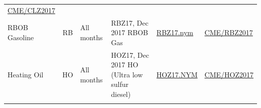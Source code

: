 \documentclass[]{book}
\theoremstyle{definition}
\theoremstyle{definition}
\theoremstyle{remark}
\begin{document}
\begin{longtable}[]{@{}lcllll@{}}
\begin{minipage}[t]{0.13\columnwidth}
\href{https://www.quandl.com/data/CME/CLZ2017-Crude-Oil-Futures-September-2017-CLZ2017}{CME/CLZ2017}\strut
\end{minipage}\tabularnewline
\begin{minipage}[t]{0.07\columnwidth}\raggedright\strut
RBOB Gasoline\strut
\end{minipage} & \begin{minipage}[t]{0.07\columnwidth}\centering\strut
RB\strut
\end{minipage} & \begin{minipage}[t]{0.32\columnwidth}\raggedright\strut
All months\strut
\end{minipage} & \begin{minipage}[t]{0.13\columnwidth}\raggedright\strut
RBZ17, Dec 2017 RBOB Gas\strut
\end{minipage} & \begin{minipage}[t]{0.13\columnwidth}\raggedright\strut
\href{https://finance.yahoo.com/quote/RBZ17.NYM}{RBZ17.nym}\strut
\end{minipage} & \begin{minipage}[t]{0.13\columnwidth}\raggedright\strut
\href{https://www.quandl.com/data/CME/RBZ2017-RBOB-Gasoline-Physical-Futures-December-2017-RBZ2017}{CME/RBZ2017}\strut
\end{minipage}\tabularnewline
\begin{minipage}[t]{0.07\columnwidth}\raggedright\strut
Heating Oil\strut
\end{minipage} & \begin{minipage}[t]{0.07\columnwidth}\centering\strut
HO\strut
\end{minipage} & \begin{minipage}[t]{0.32\columnwidth}\raggedright\strut
All months\strut
\end{minipage} & \begin{minipage}[t]{0.13\columnwidth}\raggedright\strut
HOZ17, Dec 2017 HO (Ultra low sulfur diesel)\strut
\end{minipage} & \begin{minipage}[t]{0.13\columnwidth}\raggedright\strut
\href{https://finance.yahoo.com/quote/HOZ17.NYM/?p=HOZ17.NYM}{HOZ17.NYM}\strut
\end{minipage} & \begin{minipage}[t]{0.13\columnwidth}\raggedright\strut
\href{https://www.quandl.com/data/CME/HOZ2017-NY-Harbor-ULSD-Futures-December-2017-HOZ2017}{CME/HOZ2017}\strut
\end{minipage}\tabularnewline
\begin{minipage}[t]{0.07\columnwidth}\raggedright\strut

\end{minipage}
\end{longtable}
\end{document}
